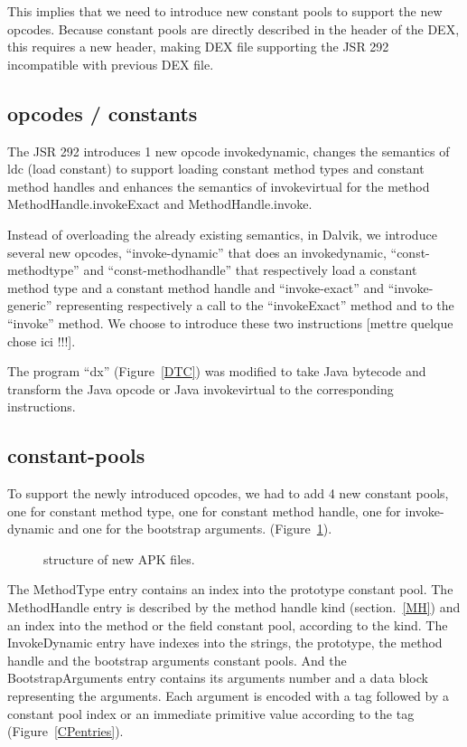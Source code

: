 \documentclass{sig-alternate}
\def \Jsr{JSR\xspace}
\def \JSR{\Jsr 292\xspace}
\begin{document}
  This implies that we need to introduce new constant pools to support the new opcodes.
  Because constant pools are directly described in the header of the DEX,
  this requires a new header, making DEX file supporting the JSR 292 incompatible
  with previous DEX file.
  
  \subsection{opcodes / constants}
    The \JSR introduces 1 new opcode invokedynamic, changes the semantics of ldc (load constant)
    to support loading constant method types and constant method handles and enhances the semantics
    of invokevirtual for the method MethodHandle.invokeExact and MethodHandle.invoke.

    Instead of overloading the already existing semantics, in Dalvik, we introduce several new opcodes,
    ``invoke-dynamic'' that does an invokedynamic,
    ``const-methodtype'' and ``const-methodhandle'' that respectively load a constant method type
    and a constant method handle and
    ``invoke-exact'' and ``invoke-generic'' representing respectively a call to the ``invokeExact'' method and to the ``invoke'' method.
    We choose to introduce these two instructions [mettre quelque chose ici !!!].

    The program ``dx'' (Figure~\ref{DTC}) was modified to take Java bytecode and 
    transform the Java opcode or Java invokevirtual to the corresponding instructions.

  \subsection{constant-pools}
    \label{CP}

    To support the newly introduced opcodes, we had to add 4 new constant pools,
    one for constant method type, one for constant method handle, one for invoke-dynamic
    and one for the bootstrap arguments. (Figure~\ref{SNA}).

    \begin{figure}[!ht]
      \centering \resizebox{.45\linewidth}{!}{}
      \caption{structure of new APK files.}
      \label{SNA}
    \end{figure}

    The MethodType entry contains an index into the prototype constant pool.
    The MethodHandle entry is described by the method handle kind (section.~\ref{MH})
    and an index into the method or the field constant pool, according to the kind.
    The InvokeDynamic entry have indexes into the strings, the prototype,
    the method handle and the bootstrap arguments constant pools.
    And the BootstrapArguments entry contains its arguments number
    and a data block representing the arguments.
    Each argument is encoded with a tag followed by a constant pool index or
    an immediate primitive value according to the tag (Figure~\ref{CPentries}).
\end{document}
